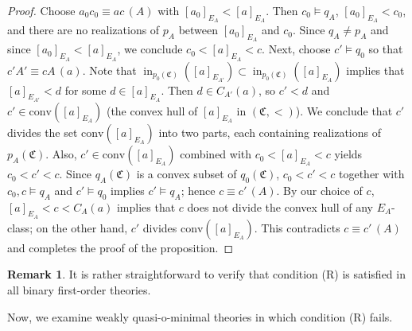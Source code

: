 \documentclass{amsart}
\theoremstyle{definition}
\theoremstyle{definition}
\newtheorem{Remark}[Theorem]{Remark}
\newcommand{\Mon}{\mathfrak C}
\newcommand{\conv}{\mathrm{conv}}
\DeclareMathOperator{\supin}{in}
\begin{document}
\begin{proof}
Choose $a_0c_0\equiv ac\,(A)$ with $[a_0]_{E_A}<[a]_{E_A}$. Then $c_0\models q_A$, $[a_0]_{E_A}<c_0$, and there are no realizations of $p_A$ between $[a_0]_{E_A}$ and $c_0$. Since $q_A\neq p_A$ and since $[a_0]_{E_A}<[a]_{E_A}$, we conclude $c_0<[a]_{E_A}<c$. Next, choose $c'\models q_0$ so that $c'A'\equiv cA\,(a)$. 
Note that $\supin_{p_0(\Mon)} ([a]_{E_{A'}})\subset\supin_{p_0(\Mon)} ([a]_{E_A})$ implies that $[a]_{E_{A'}}<d$ for some $d\in [a]_{E_A}$. 
Then $d\in C_{A'}(a)$, so $c'<d$ and $c'\in \conv([a]_{E_A})$ (the convex hull of $[a]_{E_A}$ in $(\Mon,<)$). 
We conclude that $c'$ divides the set $\conv([a]_{E_A})$ into two parts, each containing realizations of $p_A(\Mon)$. Also, $c'\in \conv([a]_{E_A})$ combined with $c_0<[a]_{E_A}<c$ yields $c_0<c'<c$. Since $q_A(\Mon)$ is a convex subset of $q_0(\Mon)$, $c_0<c'<c$ together with $c_0,c\models q_A$ and $c'\models q_0$ implies $c'\models q_A$; hence $c\equiv c'\,(A)$. By our choice of $c$, $[a]_{E_A}<c<C_A(a)$ implies that $c$ does not divide the convex hull of any $E_A$-class; on the other hand, $c'$ divides $\conv([a]_{E_A})$. This contradicts $c\equiv c'\,(A)$ and completes the proof of the proposition. 
\end{proof}

\begin{Remark}\label{Remark_R_for binary} It is rather straightforward to verify that condition (R) is satisfied in all binary first-order theories.    
\end{Remark}

Now, we examine weakly quasi-o-minimal theories in which condition (R) fails. 
\end{document}

